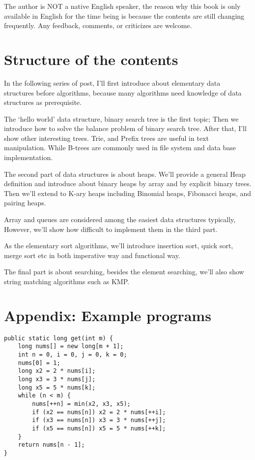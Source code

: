 \documentclass[b5paper]{article}
\begin{document}
The author is NOT a native English speaker, the reason why
this book is only available in English for the time being
is because the contents are still changing frequently. Any
feedback, comments, or criticizes are welcome.

\section{Structure of the contents}
In the following series of post, I'll first introduce about
elementary data structures before algorithms, because many
algorithms need knowledge of data structures as prerequisite.

The `hello world' data structure, binary search tree is the
first topic; Then we introduce how to solve the balance problem
of binary search tree. After that, I'll show other interesting
trees. Trie, and Prefix trees are useful in text manipulation.
While B-trees are commonly used in file system and data base
implementation.

The second part of data structures is about heaps. We'll
provide a general Heap definition and introduce about binary
heaps by array and by explicit binary trees. Then we'll
extend to K-ary heaps including Binomial heaps, Fibonacci
heaps, and pairing heaps.

Array and queues are considered among the easiest data structures
typically, However, we'll show how difficult to implement
them in the third part.

As the elementary sort algorithms, we'll introduce insertion
sort, quick sort, merge sort etc in both imperative way
and functional way.

The final part is about searching, besides the element
searching, we'll also show string matching algorithms
such as KMP.

\section{Appendix: Example programs}


\begin{lstlisting}[language = Bourbaki]
public static long get(int m) {
    long nums[] = new long[m + 1];
    int n = 0, i = 0, j = 0, k = 0;
    nums[0] = 1;
    long x2 = 2 * nums[i];
    long x3 = 3 * nums[j];
    long x5 = 5 * nums[k];
    while (n < m) {
        nums[++n] = min(x2, x3, x5);
        if (x2 == nums[n]) x2 = 2 * nums[++i];
        if (x3 == nums[n]) x3 = 3 * nums[++j];
        if (x5 == nums[n]) x5 = 5 * nums[++k];
    }
    return nums[n - 1];
}
\end{lstlisting}
\end{document}
